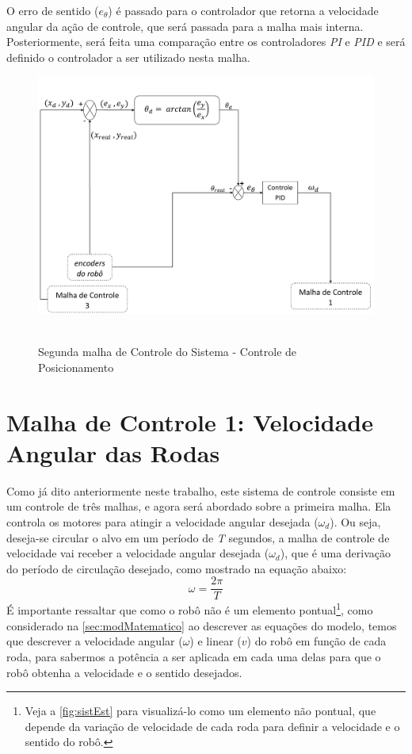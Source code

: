 O erro de sentido (\emph{$e_{\theta}$}) é passado para o controlador que retorna a velocidade angular da ação de controle, que será passada para a malha mais interna. Posteriormente, será feita uma comparação entre os controladores \emph{PI} e \emph{PID} e será definido o controlador a ser utilizado nesta malha.

\begin{figure}[!htb]
	\centering
	\caption{Segunda malha de Controle do Sistema - Controle de Posicionamento}
	\includegraphics[width=1.0\textwidth]{./04-figuras/malha2}
	\
	\label{fig:malha2}
\end{figure}

 
\section{Malha de Controle 1: Velocidade Angular das Rodas}
\label{sec:malha1 } 
Como já dito anteriormente neste trabalho, este sistema de controle consiste em um controle de três malhas, e agora será abordado sobre a primeira malha. Ela controla os motores para atingir a velocidade angular desejada ($ \omega _{d} $). Ou seja, deseja-se circular o alvo em um período de \emph{T} segundos, a malha de controle de velocidade vai receber a velocidade angular desejada ($ \omega _{d} $), que é uma derivação do período de circulação desejado, como mostrado na equação abaixo:
\begin{equation}
\omega = \dfrac{2\pi}{T}
\label{eq:velocangular}
\end{equation}
É importante ressaltar que como o robô não é um elemento pontual\footnote{Veja a \autoref{fig:sistEst} para visualizá-lo como um elemento não pontual, que depende da variação de velocidade de cada roda para definir a velocidade e o sentido do robô.}, como considerado na \autoref{sec:modMatematico} ao descrever as equações do modelo, temos que descrever a velocidade angular (\emph{$\omega$}) e linear (\emph{$v$}) do robô em função de cada roda, para sabermos a potência a ser aplicada em cada uma delas para que o robô obtenha a velocidade e o sentido desejados.

